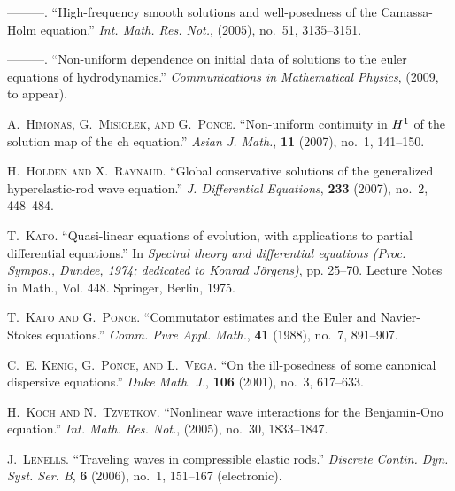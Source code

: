 \documentclass[12pt,reqno]{amsart}
\theoremstyle{plain}  %
\theoremstyle{definition}
\begin{document}
\begin{thebibliography}{10}
---{}---{}---.
\newblock \enquote{High-frequency smooth solutions and well-posedness of the
  {C}amassa-{H}olm equation.}
\newblock \emph{Int. Math. Res. Not.},  (2005), no.~51, 3135--3151.

---{}---{}---.
\newblock \enquote{Non-uniform dependence on initial data of solutions to the
  euler equations of hydrodynamics.}
\newblock \emph{Communications in Mathematical Physics},  (2009, to appear).

\textsc{A.~Himonas, G.~Misio{\l}ek, and G.~Ponce}.
\newblock \enquote{Non-uniform continuity in {$H\sp 1$} of the solution map of
  the ch equation.}
\newblock \emph{Asian J. Math.}, \textbf{11} (2007), no.~1, 141--150.

\textsc{H.~Holden and X.~Raynaud}.
\newblock \enquote{Global conservative solutions of the generalized
  hyperelastic-rod wave equation.}
\newblock \emph{J. Differential Equations}, \textbf{233} (2007), no.~2,
  448--484.

\textsc{T.~Kato}.
\newblock \enquote{Quasi-linear equations of evolution, with applications to
  partial differential equations.}
\newblock In \emph{Spectral theory and differential equations ({P}roc.
  {S}ympos., {D}undee, 1974; dedicated to {K}onrad {J}{\"o}rgens)}, pp. 25--70.
  Lecture Notes in Math., Vol. 448. Springer, Berlin, 1975.

\textsc{T.~Kato and G.~Ponce}.
\newblock \enquote{Commutator estimates and the {E}uler and {N}avier-{S}tokes
  equations.}
\newblock \emph{Comm. Pure Appl. Math.}, \textbf{41} (1988), no.~7, 891--907.

\textsc{C.~E. Kenig, G.~Ponce, and L.~Vega}.
\newblock \enquote{On the ill-posedness of some canonical dispersive
  equations.}
\newblock \emph{Duke Math. J.}, \textbf{106} (2001), no.~3, 617--633.

\textsc{H.~Koch and N.~Tzvetkov}.
\newblock \enquote{Nonlinear wave interactions for the {B}enjamin-{O}no
  equation.}
\newblock \emph{Int. Math. Res. Not.},  (2005), no.~30, 1833--1847.

\textsc{J.~Lenells}.
\newblock \enquote{Traveling waves in compressible elastic rods.}
\newblock \emph{Discrete Contin. Dyn. Syst. Ser. B}, \textbf{6} (2006), no.~1,
  151--167 (electronic).


\end{thebibliography}
\end{document}
